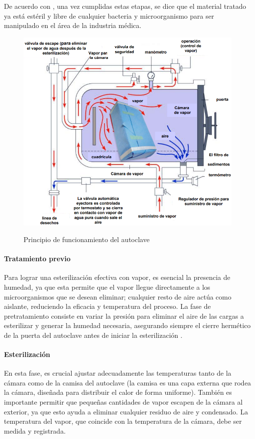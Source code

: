 De acuerdo con \cite{funcionamiento}, una vez cumplidas estas etapas, se dice que el material tratado ya está estéril y libre de cualquier bacteria y microorganismo para ser manipulado en el área de la industria médica.

\begin{figure}[!htb]
   \centering
   \caption{Principio de funcionamiento del autoclave}
   {\includegraphics[scale=0.8]{Figuras/autoclave.png}}\\
\end{figure}

\paragraph{Tratamiento previo}
Para lograr una esterilización efectiva con vapor, es esencial la presencia de humedad, ya que esta permite que el vapor llegue directamente a los microorganismos que se desean eliminar; cualquier resto de aire actúa como aislante, reduciendo la eficacia y temperatura del proceso. La fase de pretratamiento consiste en variar la presión para eliminar el aire de las cargas a esterilizar y generar la humedad necesaria, asegurando siempre el cierre hermético de la puerta del autoclave antes de iniciar la esterilización \citep{funcionamiento2}.

\paragraph{Esterilización}
En esta fase, es crucial ajustar adecuadamente las temperaturas tanto de la cámara como de la camisa del autoclave (la camisa es una capa externa que rodea la cámara, diseñada para distribuir el calor de forma uniforme). También es importante permitir que pequeñas cantidades de vapor escapen de la cámara al exterior, ya que esto ayuda a eliminar cualquier residuo de aire y condensado. La temperatura del vapor, que coincide con la temperatura de la cámara, debe ser medida y registrada.

